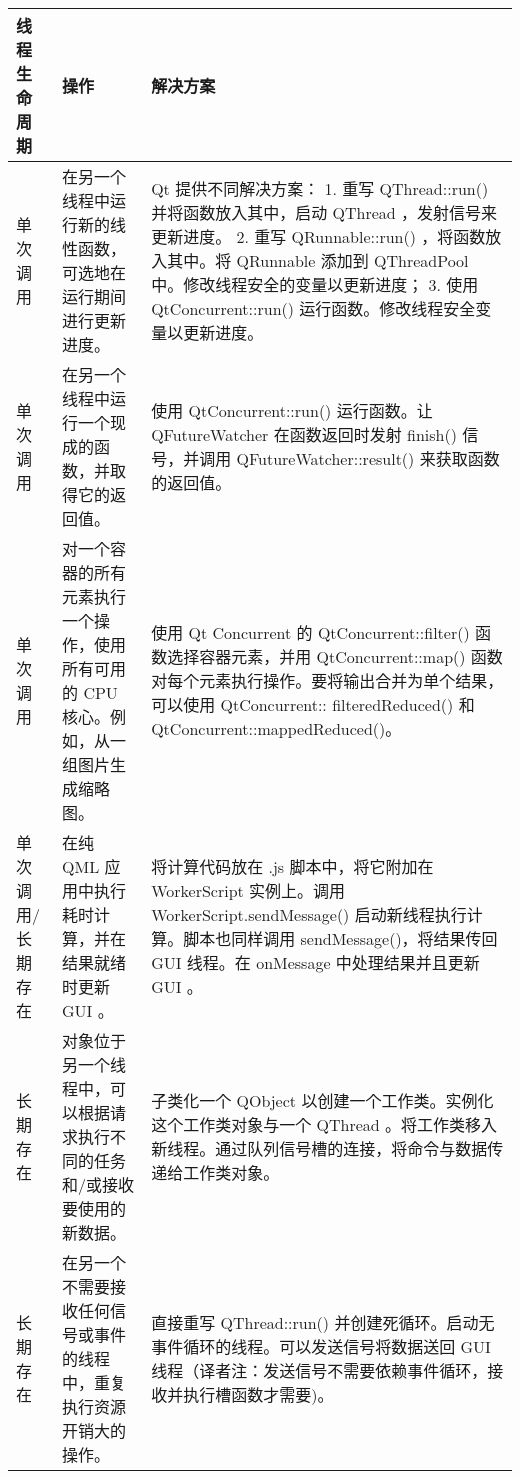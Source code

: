 \begin{longtable}{|l|m{10em}|m{15em}|}
\hline
线程生命周期 	& 操作 	 & 解决方案   \\ 
\hline
单次调用 	& 在另一个线程中运行新的线性函数，可选地在运行期间进行更新进度。 &	Qt 提供不同解决方案：
1. 重写 QThread::run() 并将函数放入其中，启动 QThread ，发射信号来更新进度。
2. 重写 QRunnable::run() ，将函数放入其中。将 QRunnable 添加到 QThreadPool 中。修改线程安全的变量以更新进度；
3. 使用 QtConcurrent::run() 运行函数。修改线程安全变量以更新进度。\\ 
\hline
单次调用 &	在另一个线程中运行一个现成的函数，并取得它的返回值。 	& 使用 QtConcurrent::run() 运行函数。让 QFutureWatcher 在函数返回时发射 finish() 信号，并调用 QFutureWatcher::result() 来获取函数的返回值。 \\ 
\hline
单次调用 &	对一个容器的所有元素执行一个操作，使用所有可用的 CPU 核心。例如，从一组图片生成缩略图。 &	使用 Qt Concurrent 的 QtConcurrent::filter() 函数选择容器元素，并用 QtConcurrent::map() 函数对每个元素执行操作。要将输出合并为单个结果，可以使用 QtConcurrent:: filteredReduced() 和 QtConcurrent::mappedReduced()。 \\ 
\hline
单次调用/长期存在 &	在纯 QML 应用中执行耗时计算，并在结果就绪时更新 GUI 。 &	将计算代码放在 .js 脚本中，将它附加在 WorkerScript 实例上。调用 WorkerScript.sendMessage() 启动新线程执行计算。脚本也同样调用 sendMessage()，将结果传回 GUI 线程。在 onMessage 中处理结果并且更新 GUI 。 \\ 
\hline
长期存在 & 对象位于另一个线程中，可以根据请求执行不同的任务和/或接收要使用的新数据。 &	子类化一个 QObject 以创建一个工作类。实例化这个工作类对象与一个 QThread 。将工作类移入新线程。通过队列信号槽的连接，将命令与数据传递给工作类对象。 \\ 
\hline
长期存在 &	在另一个不需要接收任何信号或事件的线程中，重复执行资源开销大的操作。 & 	直接重写 QThread::run() 并创建死循环。启动无事件循环的线程。可以发送信号将数据送回 GUI 线程（译者注：发送信号不需要依赖事件循环，接收并执行槽函数才需要)。 \\
\hline
\end{longtable}